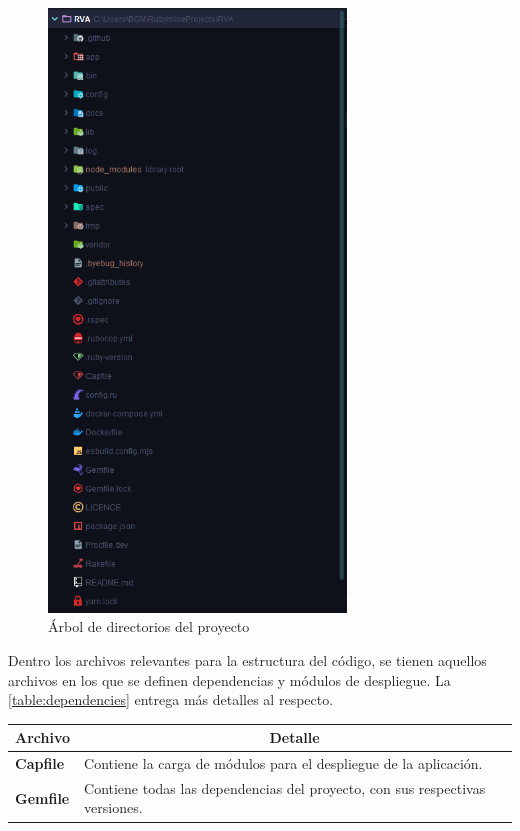 \begin{figure}[H]
  \begin{center}
    \includegraphics[height=16cm]{img/tree.png} 
  \end{center}
  \caption[Árbol de directorios del proyecto]{Árbol de directorios del proyecto}
  \label{fig:tree}
\end{figure}

Dentro los archivos relevantes para la estructura del código, se tienen aquellos archivos en los que se definen dependencias y módulos de despliegue. La \autoref{table:dependencies} entrega más detalles al respecto.

\begin{center}
  \begin{tabular}{ | l | p{12.5cm} |}
    \hline
    \multicolumn{1}{|c|}{\textbf{Archivo}} & \multicolumn{1}{|c|}{\textbf{Detalle}} \\
    \hline
    
    {\textbf{Capfile}} & Contiene la carga de módulos para el despliegue de la aplicación. \\ \hline
    {\textbf{Gemfile}} & Contiene todas las dependencias del proyecto, con sus respectivas versiones. \\ \hline
  \end{tabular}
  
  \label{table:dependencies}
\end{center}

